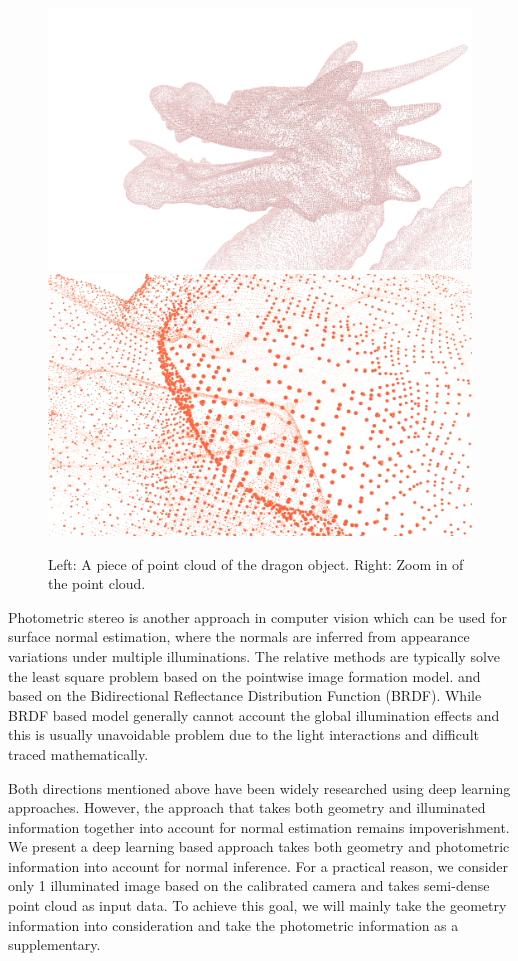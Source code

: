 \begin{figure}[h!]
	\centering
	{\includegraphics[width=.45\textwidth]{./Figures/point-cloud.png}}
	{\includegraphics[width=.45\textwidth]{./Figures/point-cloud-zoom-in.png}}
	\decoRule
	\caption{Left: A piece of point cloud of the dragon object. Right: Zoom in of the point cloud.}
	\label{fig:point-cloud}
\end{figure}

Photometric stereo is another approach in computer vision which can be used for surface normal estimation, where the normals are inferred from appearance variations under multiple illuminations. The relative methods are typically solve the least square problem based on the pointwise image formation model.\cite{SFS} and based on the Bidirectional Reflectance Distribution Function (BRDF). While BRDF based model generally cannot account the global illumination effects and this is usually unavoidable problem due to the light interactions and difficult traced mathematically.

Both directions mentioned above have been widely researched using deep learning approaches. However, the approach that takes both geometry and illuminated information together into account for normal estimation remains impoverishment. We present a deep learning based approach takes both geometry and photometric information into account for normal inference. For a practical reason, we consider only 1 illuminated image based on the calibrated camera and takes semi-dense point cloud as input data. To achieve this goal, we will mainly take the geometry information into consideration and take the photometric information as a supplementary.

